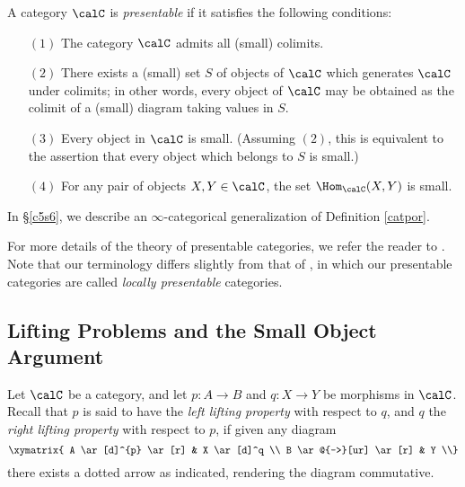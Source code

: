 \begin{definition}\label{catpor}
A category $\calC$ is {\it presentable} if it satisfies the following conditions:
\begin{itemize}
\item[$(1)$] The category $\calC$ admits all (small) colimits.

\item[$(2)$] There exists a (small) set $S$ of objects of $\calC$ which generates
$\calC$ under colimits; in other words, every object of $\calC$ may be obtained as the colimit of a (small) diagram taking values in $S$.

\item[$(3)$] Every object in $\calC$ is small. (Assuming $(2)$, this is equivalent to the assertion
that every object which belongs to $S$ is small.)

\item[$(4)$] For any pair of objects $X,Y \in \calC$, the set $\Hom_{\calC}(X,Y)$ is small.
\end{itemize}
\end{definition}

\begin{remark}
In \S \ref{c5s6}, we describe an $\infty$-categorical generalization of Definition \ref{catpor}.
\end{remark}

\begin{remark}
For more details of the theory of presentable categories, we refer the reader to \cite{adamek}. Note that our terminology differs slightly from that of \cite{adamek}, in which our presentable categories are called {\it locally presentable} categories.
\end{remark}

\subsection{Lifting Problems and the Small Object Argument}\label{liftingprobs}

Let $\calC$ be a category, and let $p: A \rightarrow B$ and $q: X
\rightarrow Y$ be morphisms in $\calC$. Recall that $p$ is said to
have the {\it left lifting property} with respect to $q$, and $q$
the {\it right lifting property} with respect to $p$, if given any diagram
$$ \xymatrix{ A \ar[d]^{p} \ar[r] & X \ar[d]^q \\
B \ar@{-->}[ur] \ar[r] & Y \\} $$
there exists a dotted arrow as indicated, rendering the diagram commutative.

